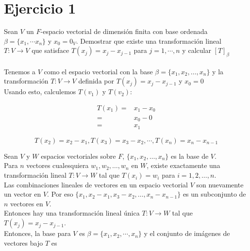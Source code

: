 \section*{Ejercicio 1}

Sean $V$ un $F$-espacio vectorial de dimensión finita con base ordenada
$\beta = \{ x_{1}, \cdots x_{n} \}$ y $x_{0} = 0_{V}$. Demostrar que existe 
una transformación lineal $T: V \rightarrow V$ que satisface $T(x_{j}) = x_{j} - x_{j-1}$
para $j = 1, \cdots , n$ y calcular $\left[ T \right]_{\beta}$\\

\noindent \solucion \\

Tenemos a $V$ como el espacio vectorial con la base $\beta = \{x_1, x_2, \ldots, x_n\}$ y la transformación $T : V \to V$ definida por 
$T(x_j) = x_j - x_{j - 1}$ y $x_{0} = 0$\\

Usando esto, calculemos $T(v_1)$ y $T(v_2)$:

\begin{align*}
    T(x_1) = & x_1 - x_0 \\
    = & x_0 - 0 \\ 
    = & x_1
\end{align*}

$$ T(x_{2}) = x_{2} - x_{1} , T(x_{3})  = x_{3} - x_{2}, \cdots , T(x_{n}) = x_{n} - x_{n-1} $$

\noindent Sean \(V\) y \(W\) espacios vectoriales sobre \(F\), \(\{x_1, x_2, \ldots, x_n\}\) es la base de \(V\).\\

\noindent Para $n$ vectores cualesquiera $w_1, w_2, \ldots, w_n$ en $W$, existe exactamente una transformación lineal $T: V \to W$ tal que $T(x_i) = w_i$ para $i = 1, 2, \ldots, n$. \\

\noindent Las combinaciones lineales de vectores en un espacio vectorial $V$ son nuevamente un vector en $V$. Por eso $\{x_1, x_2 - x_1, x_3 - x_2, \ldots, x_n - x_{n-1} \}$ es un subconjunto de $n$ vectores en $V$. \\

\noindent Entonces hay una transformación lineal única $T: V \rightarrow W$ tal que  $T(x_{j}) = x_{j} - x_{j-1}$.\\

\noindent Entonces, la base para $V$ es $\beta = \{x_1, x_2, \cdots , x_n\}$ y el conjunto
 de imágenes de vectores bajo $T$ es 
 
